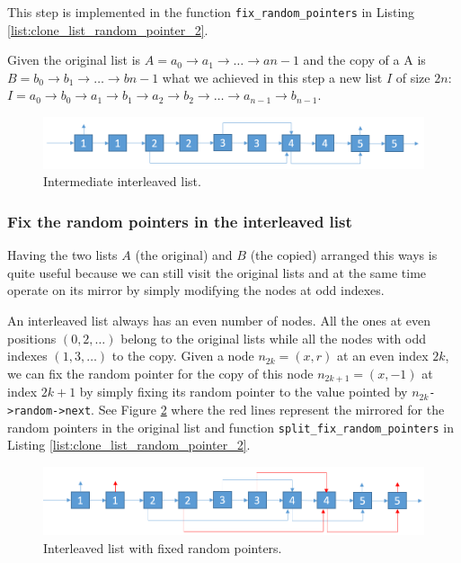 This step is implemented in the function \lstinline[columns=fixed]{fix_random_pointers} in Listing \ref{list:clone_list_random_pointer_2}.

Given the original list is  $A= a_0 \rightarrow a_1 \rightarrow \ldots \rightarrow a{n-1}$ and the copy of a A is $B = b_0 \rightarrow b_1 \rightarrow \ldots \rightarrow b{n-1}$ what we achieved in this step a new list $I$ of size $2n$: $I=a_0 \rightarrow b_0 \rightarrow a_1 \rightarrow b_1 \rightarrow a_2 \rightarrow b_2 \rightarrow \ldots \rightarrow a_{n-1} \rightarrow b_{n-1}$.

\begin{figure}
	\centering
	\includegraphics[scale=0.5]{sources/clone_list_random_pointer/images/random_list_2}
	\caption{Intermediate interleaved list.}
	\label{fig:clone_list_random_pointer:interleaved}
\end{figure}


\subsubsection{Fix the random pointers in the interleaved list}
\label{clone_list_random_pointer:sec:interleaved_lists2}
Having the two   lists  $A$ (the original) and $B$ (the copied) arranged this ways is quite useful because we can still visit the original lists and at the same time operate on its mirror by simply modifying the nodes at odd indexes.

An interleaved list always has an even number of nodes. 
All the ones at even positions $(0,2,\ldots)$ belong to the original lists while all the nodes with odd indexes $(1,3,\ldots)$ to the copy.
Given a node $n_{2k}=(x,r)$ at an even index $2k$, we can fix the random pointer for the copy of this node $n_{2k+1}=(x,-1)$ at index $2k+1$ by simply fixing its random pointer to the value pointed by $n_{2k}$\lstinline[columns=fixed]{->random->next}. See Figure \ref{fig:clone_list_random_pointer:interleaved_fixed} where the red lines represent the mirrored for the random pointers in the original list and function \lstinline[columns=fixed]{split_fix_random_pointers} in Listing \ref{list:clone_list_random_pointer_2}.

\begin{figure}
	\centering
	\includegraphics[scale=0.5]{sources/clone_list_random_pointer/images/random_list_3}
	\caption{Interleaved list with fixed random pointers.}
	\label{fig:clone_list_random_pointer:interleaved_fixed}
\end{figure}

